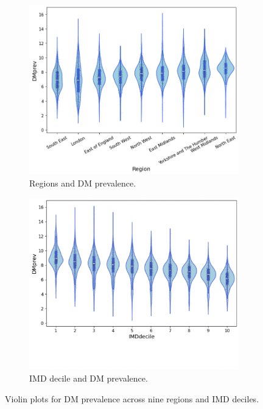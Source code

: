 \begin{figure}[ht]
\centering
\begin{subfigure}{.50\textwidth}
  \centering
  \includegraphics[width=1\linewidth]{ucl-latex-thesis-templates-master/Image/datageo_violin_3.1.png}
  \caption{Regions and DM prevalence.}
  \label{fig:A4.11}
\end{subfigure}%
\begin{subfigure}{.50\textwidth}
  \centering
  \includegraphics[width=1\linewidth]{ucl-latex-thesis-templates-master/Image/datageo_violin_3.2.png}
  \caption{IMD decile and DM prevalence.}
  \label{fig:A4.12}
\end{subfigure}
\caption{Violin plots for DM prevalence across nine regions and IMD deciles.}
\label{fig:A4.1}
\end{figure}

